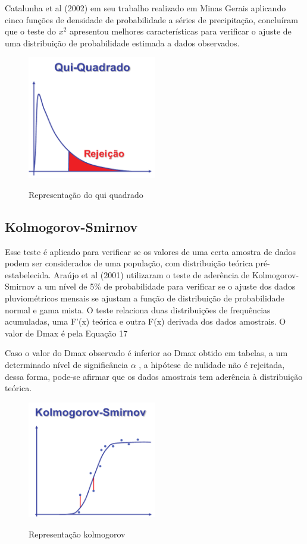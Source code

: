 Catalunha et al (2002) em seu trabalho realizado em Minas Gerais aplicando cinco funções de densidade de probabilidade a séries de precipitação, concluíram que o teste do $x^2$  apresentou melhores características para verificar o ajuste de uma distribuição de probabilidade estimada a dados observados.

\begin{figure}
    \caption{Representação do qui quadrado}
    \centering
    \includegraphics[width=0.5\textwidth]{Textuais/Figuras/qui-quadrado.pdf}
    \label{fig:qui-quadrado}
\end{figure}

\subsection{Kolmogorov-Smirnov}

Esse teste é aplicado para verificar se os valores de uma certa amostra de dados podem ser considerados de uma população, com distribuição teórica pré-estabelecida.
Araújo et al (2001) utilizaram o teste de aderência de Kolmogorov- Smirnov a um nível de 5\% de probabilidade para verificar se o ajuste dos dados pluviométricos mensais se ajustam a função de distribuição de probabilidade normal e gama mista. O teste relaciona duas distribuições de frequências acumuladas, uma F’(x) teórica e outra F(x) derivada dos dados amostrais. O valor de Dmax é pela Equação 17

Caso o valor do Dmax observado é inferior ao Dmax obtido em tabelas, a um determinado nível de significância $\alpha$ , a hipótese de nulidade não é rejeitada, dessa forma, pode-se afirmar que os dados amostrais tem aderência à distribuição teórica.

\begin{figure}
    \caption{Representação kolmogorov}
    \centering
    \includegraphics[width=0.5\textwidth]{Textuais/Figuras/kolmogorov.pdf}
    \label{fig:kolmogorov}
\end{figure}